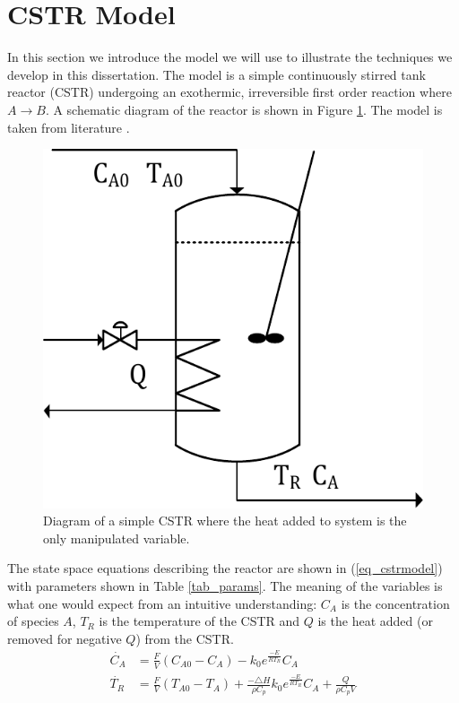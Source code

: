 \documentclass[../masters.tex]{subfiles}
\begin{document}
\graphicspath{{./imgs/}{../imgs/}} %

\section{CSTR Model}
In this section we introduce the model we will use to illustrate the techniques we develop in this dissertation. The model is a simple continuously stirred tank reactor (CSTR) undergoing an exothermic, irreversible first order reaction where $A \rightarrow B$. A schematic diagram of the reactor is shown in Figure \ref{fig_cstr_diagram}. The model is taken from literature \cite{cstrmodel}.
\begin{figure}[H] 
\centering
\includegraphics[scale=0.8]{cstr_diagram.pdf}
\caption{Diagram of a simple CSTR where the heat added to system is the only manipulated variable.}
\label{fig_cstr_diagram}
\end{figure}
The state space equations describing the reactor are shown in (\ref{eq_cstrmodel}) with parameters shown in Table \ref{tab_params}. The meaning of the variables is what one would expect from an intuitive understanding: $C_A$ is the concentration of species $A$, $T_R$ is the temperature of the CSTR and $Q$ is the heat added (or removed for negative $Q$) from the CSTR.
\begin{equation}
\begin{aligned}
\dot{C_A} &= \frac{F}{V}\left( C_{A0}-C_A \right) - k_0e^{\frac{-E}{RT_R}}C_A \\
\dot{T_R} &= \frac{F}{V}\left(T_{A0}-T_A\right) + \frac{-\triangle H}{\rho C_p}k_0e^{\frac{-E}{RT_R}}C_A + \frac{Q}{\rho C_p V}
\end{aligned}
\label{eq_cstrmodel}
\end{equation}
\end{document}
